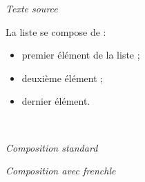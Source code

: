 \documentclass[a4paper,12pt,openright]{article}
\begin{document}
\begin{center} %
\textit{Texte source}\\[1ex]
\begin{boxedverbatim}
{\nofrenchtrivsep

La liste se compose de :
\begin{itemize}
\item premier élément de la liste ;
\item deuxième élément ;
\item dernier élément.
\end{itemize}
}
\end{boxedverbatim}
\\[.5em]\setcounter{mpfootnote}{1} %
\renewcommand{\thempfootnote}{\arabic{mpfootnote}}
\noindent
\frlabelitems{\renewcommand{\labelitemi}{--}%
\renewcommand{\labelitemii}{--}%
\renewcommand{\labelitemiii}{--}%
}
\parbox[t]{65mm}{
\begin{center} \nofrenchtypography \nofrenchlayout \english
\textit{Composition standard} \small 
\end{center}
}%
\parbox[t]{65mm}{
\begin{center} \frenchtypography \frenchlayout
\textit{Composition avec frenchle} \small
\end{center}
}\\[1.5em]
%
\end{center} %
\end{document}
